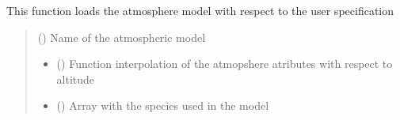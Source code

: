 \documentclass[letterpaper,10pt,english]{sphinxmanual}
\begin{document}
\begin{fulllineitems}
\label{\detokenize{modules:atmosphere.load_atmosphere}}
\pysigstartsignatures
{}
\pysigstopsignatures
\sphinxAtStartPar
This function loads the atmosphere model with respect to the user specification
\begin{quote}\begin{description}
\sphinxAtStartPar
{} () \textendash{} Name of the atmospheric model

\sphinxAtStartPar
\begin{itemize}
\item {} 
\sphinxAtStartPar
{} () \textendash{} Function interpolation of the atmopshere atributes with respect to altitude

\item {} 
\sphinxAtStartPar
{} () \textendash{} Array with the species used in the model

\end{itemize}


\end{description}\end{quote}

\end{fulllineitems}

\end{document}

